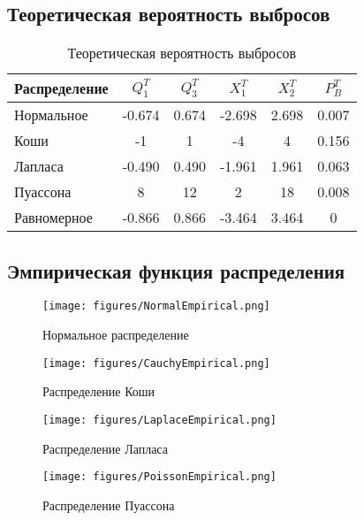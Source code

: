 \documentclass[../main.tex]{subfiles}
\begin{document}
    \subsection{Теоретическая вероятность выбросов}
    
    \begin{table}[H]
	\centering
	\begin{tabular}{|l|c|c|c|c|c|}
		\hline
		Распределение & $Q_1^T$	& $Q_3^T$ & $X_1^T$ & $X_2^T$ & $P_B^T$\\\hline
		\hline
		Нормальное & -0.674 & 0.674 & -2.698 &  2.698 & 0.007\\\hline
		Коши & -1 & 1 & -4 & 4 & 0.156\\\hline
		Лапласа & -0.490 & 0.490 & -1.961 & 1.961 & 0.063\\\hline
		Пуассона & 8 & 12 & 2 & 18 & 0.008\\\hline
		Равномерное & -0.866 & 0.866 & -3.464 & 3.464 & 0\\\hline
	\end{tabular}
	\caption{Теоретическая вероятность выбросов}
    \end{table}
    
    \subsection{Эмпирическая функция распределения}
    
    \begin{figure}[H]
        \centering
        \texttt{[image: figures/NormalEmpirical.png]}
        \caption{Нормальное распределение}
        \label{fig:normal}
    \end{figure}
    
    \begin{figure}[H]
        \centering
        \texttt{[image: figures/CauchyEmpirical.png]}
        \caption{Распределение Коши}
        \label{fig:normal}
    \end{figure}
    
    \begin{figure}[H]
        \centering
        \texttt{[image: figures/LaplaceEmpirical.png]}
        \caption{Распределение Лапласа}
        \label{fig:normal}
    \end{figure}
    
     \begin{figure}[H]
        \centering
        \texttt{[image: figures/PoissonEmpirical.png]}
        \caption{Распределение Пуассона}
        \label{fig:normal}
    \end{figure}
    
\end{document}

